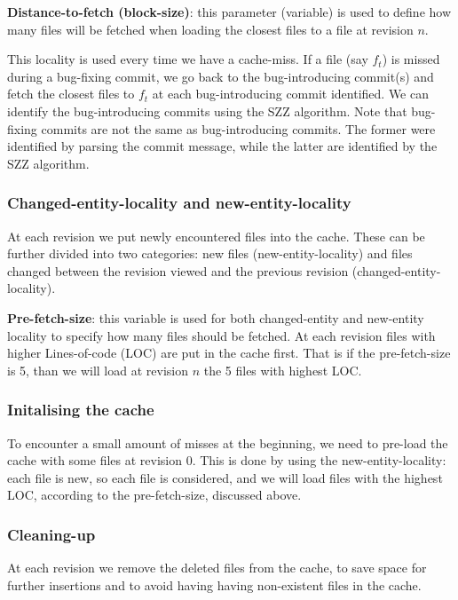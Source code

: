 \documentclass[12pt,twoside,notitlepage]{report}
\begin{document}
\textbf{Distance-to-fetch (block-size)}: this parameter (variable) is used to define how many files will be fetched when loading the closest files to a file at revision $n$.

This locality is used every time we have a cache-miss. If a file (say $f_t$) is missed during a bug-fixing commit, we go back to the bug-introducing commit(s) and fetch the closest files to $f_t$ at each bug-introducing commit identified. We can identify the bug-introducing commits using the SZZ algorithm\cite{SZZ}. Note that bug-fixing commits are not the same as bug-introducing commits. The former were identified by parsing the commit message, while the latter are identified by the SZZ algorithm.
\subsubsection{Changed-entity-locality and new-entity-locality}
At each revision we put newly encountered files into the cache. These can be further divided into two categories: new files (new-entity-locality) and files changed between the revision viewed and the previous revision (changed-entity-locality). 

\textbf{Pre-fetch-size}: this variable is used for both changed-entity and new-entity locality to specify how many files should be fetched. At each revision files with higher Lines-of-code (LOC) are put in the cache first. That is if the pre-fetch-size is 5, than we will load at revision $n$ the 5 files with highest LOC.

\subsubsection{Initalising the cache}
To encounter a small amount of misses at the beginning, we need to pre-load the cache with some files at revision $0$. This is done by using the new-entity-locality: each file is new, so each file is considered, and we will load files with the highest LOC, according to the pre-fetch-size, discussed above.
\subsubsection{Cleaning-up}
At each revision we remove the deleted files from the cache, to save space for further insertions and to avoid having having non-existent files in the cache.
\end{document}
